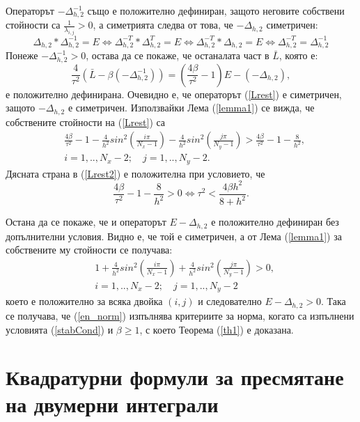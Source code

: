 \documentclass{article}
\newcommand{\be}{\begin{equation}}
\newcommand{\ee}{\end{equation}}
\newcommand{\rf}[1]{(\ref{#1})}
\begin{document}
Операторът $-\Delta_{h,2}^{-1}$ също е положително дефиниран, защото неговите собствени стойности са $\frac{1}{\lambda_{i,j}} > 0$, а симетрията следва от това, че $-\Delta_{h,2}$ симетричен:
\begin{equation*}
\Delta_{h,2} * \Delta_{h,2}^{-1} = E \Leftrightarrow \Delta_{h,2}^{-T} * \Delta_{h,2}^{T} = E \Leftrightarrow \Delta_{h,2}^{-T} * \Delta_{h,2} = E 
\Leftrightarrow \Delta_{h,2}^{-T} = \Delta_{h,2}^{-1} 
\end{equation*}
Понеже $-\Delta_{h,2}^{-1} > 0$, остава да се покаже, че останалата част в $\bar L$, която е:
\be\label{Lrest}
\frac{4}{\tau^2}\left( \bar L - \beta ( - \Delta_{h,2}^{-1}) \right) = \left( \frac{4 \beta}{\tau^2} - 1\right) E -(-\Delta_{h,2}),
\ee
е положително дефинирана. Очевидно е, че операторът \rf{Lrest} е симетричен, защото $-\Delta_{h,2}$ е симетричен. Използвайки Лема \rf{lemma1} се вижда, че собствените стойности на \rf{Lrest} са
\begin{align}\label{Lrest2}
 &\frac{4 \beta}{\tau^2} - 1 - \frac{4}{h^2}sin^2(\frac{i \pi}{N_x-1}) - \frac{4}{h^2}sin^2(\frac{j \pi}{N_y-1}) > \frac{4 \beta}{\tau^2} - 1 - \frac{8}{h^2}, \\
&i = 1,..,N_x-2; \quad j = 1, .. , N_y-2. \nonumber
\end{align}
Дясната страна в \rf{Lrest2} е положителна при условието, че
\be\label{stabCond}
\frac{4 \beta}{\tau^2} - 1 - \frac{8}{h^2} > 0  \Leftrightarrow \tau^2 < \frac{4 \beta h^2}{8 + h^2}.
\ee

Остана да се покаже, че и операторът $E - \Delta_{h, 2}$ е положително дефиниран без допълнителни условия. Видно е, че той е симетричен, а от Лема \rf{lemma1} за собствените му стойности се получава:
\begin{align}
&1+ \frac{4}{h^2}sin^2(\frac{i \pi}{N_x-1}) + \frac{4}{h^2}sin^2(\frac{j \pi}{N_y-1}) >0, \nonumber\\
&i = 1,..,N_x-2; \quad j = 1, .. , N_y-2 \nonumber
\end{align}
което е положително за всяка двойка $(i, j)$ и следователно $E - \Delta_{h, 2} > 0$. Така се получава, че \rf{en_norm} изпълнява критериите за норма, когато са изпълнени условията \rf{stabCond} и $\beta \ge 1$, с което Теорема \rf{th1} е доказана.

\section{Квадратурни формули за пресмятане на двумерни интеграли}
\end{document}
